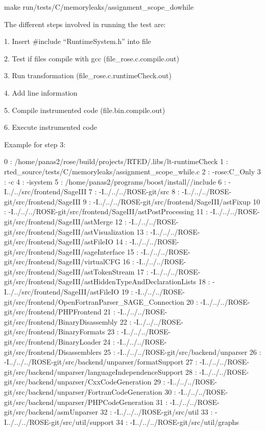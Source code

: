   make run/tests/C/memoryleaks/assignment\_scope\_dowhile

The different steps involved in running the test are:

1. Insert \#include ``RuntimeSystem.h'' into file

2. Test if files compile with gcc (file\_rose.c.compile.out)

3. Run transformation (file\_rose.c.runtimeCheck.out)

4. Add line information

5. Compile instrumented code (file.bin.compile.out)

6. Execute instrumented code


Example for step 3:

  0 : /home/panas2/rose/build/projects/RTED/.libs/lt-runtimeCheck
  1 : rted\_source/tests/C/memoryleaks/assignment\_scope\_while.c
  2 : -rose:C\_Only
  3 : -c
  4 : -isystem
  5 : /home/panas2/programs/boost/install//include
  6 : -I../../src/frontend/SageIII
  7 : -I../../../ROSE-git/src
  8 : -I../../../ROSE-git/src/frontend/SageIII
  9 : -I../../../ROSE-git/src/frontend/SageIII/astFixup
  10 : -I../../../ROSE-git/src/frontend/SageIII/astPostProcessing
  11 : -I../../../ROSE-git/src/frontend/SageIII/astMerge
  12 : -I../../../ROSE-git/src/frontend/SageIII/astVisualization
  13 : -I../../../ROSE-git/src/frontend/SageIII/astFileIO
  14 : -I../../../ROSE-git/src/frontend/SageIII/sageInterface
  15 : -I../../../ROSE-git/src/frontend/SageIII/virtualCFG
  16 : -I../../../ROSE-git/src/frontend/SageIII/astTokenStream
  17 : -I../../../ROSE-git/src/frontend/SageIII/astHiddenTypeAndDeclarationLists
  18 : -I../../src/frontend/SageIII/astFileIO
  19 : -I../../../ROSE-git/src/frontend/OpenFortranParser\_SAGE\_Connection
  20 : -I../../../ROSE-git/src/frontend/PHPFrontend
  21 : -I../../../ROSE-git/src/frontend/BinaryDisassembly
  22 : -I../../../ROSE-git/src/frontend/BinaryFormats
  23 : -I../../../ROSE-git/src/frontend/BinaryLoader
  24 : -I../../../ROSE-git/src/frontend/Disassemblers
  25 : -I../../../ROSE-git/src/backend/unparser
  26 : -I../../../ROSE-git/src/backend/unparser/formatSupport
  27 : -I../../../ROSE-git/src/backend/unparser/languageIndependenceSupport
  28 : -I../../../ROSE-git/src/backend/unparser/CxxCodeGeneration
  29 : -I../../../ROSE-git/src/backend/unparser/FortranCodeGeneration
  30 : -I../../../ROSE-git/src/backend/unparser/PHPCodeGeneration
  31 : -I../../../ROSE-git/src/backend/asmUnparser
  32 : -I../../../ROSE-git/src/util
  33 : -I../../../ROSE-git/src/util/support
  34 : -I../../../ROSE-git/src/util/graphs
